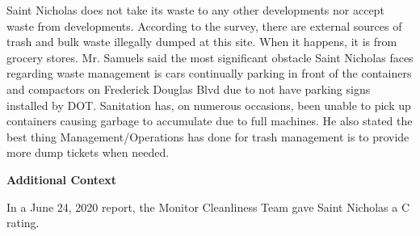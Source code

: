 Saint Nicholas does not take its waste to any other developments nor accept waste from developments. According to the survey, there are external sources of trash and bulk waste illegally dumped at this site. When it happens, it is from grocery stores. Mr. Samuels said the most significant obstacle Saint Nicholas faces regarding waste management is cars continually parking in front of the containers and compactors on Frederick Douglas Blvd due to not have parking signs installed by DOT. Sanitation has, on numerous occasions, been unable to pick up containers causing garbage to accumulate due to full machines. He also stated the best thing Management/Operations has done for trash management is to provide more dump tickets when needed.  

\textbf{Additional Context}  

In a June 24, 2020 report, the Monitor Cleanliness Team gave Saint Nicholas a C rating.  

 
